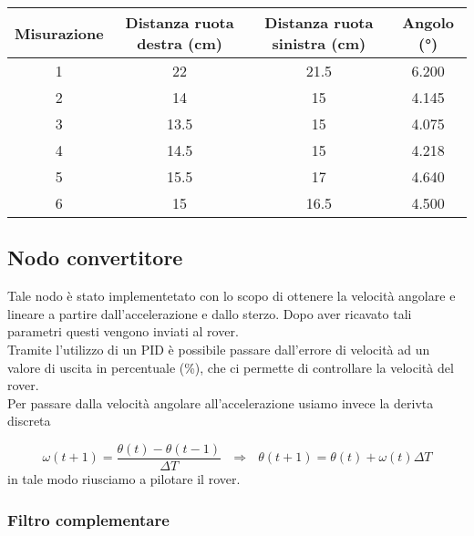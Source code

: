 \begin{table} [H]
    \centering
    \begin{tabular}{|c|c|c|c|}
    \hline
        Misurazione & Distanza ruota destra (cm) & Distanza ruota sinistra (cm) & Angolo (°) \\  \hline
        1 & 22 & 21.5& 6.200 \\  \hline
        2 & 14& 15& 4.145  \\  \hline
        3 & 13.5&15&  4.075 \\  \hline
        4 & 14.5&15&  4.218 \\  \hline
        5 & 15.5& 17& 4.640 \\  \hline
        6 & 15&16.5& 4.500  \\  \hline
    \end{tabular}
\end{table}

\subsection{Nodo convertitore}
Tale nodo è stato implementetato con lo scopo di ottenere la velocità angolare e lineare a partire dall'accelerazione e dallo sterzo. Dopo aver ricavato tali parametri questi vengono inviati al rover.\\
Tramite l'utilizzo di un PID è possibile passare dall'errore di velocità ad un valore di uscita in percentuale (\%), che ci permette di controllare la velocità del rover.\\ Per passare dalla velocità angolare all'accelerazione usiamo invece la derivta discreta

\begin{equation}
\omega(t+1)=\frac{\theta(t)-\theta(t-1)}{\Delta{T}} \ \ \
\Rightarrow \ \ \ \theta(t+1)=\theta(t)+\omega(t)\Delta{T}
\end{equation}  
in tale modo riusciamo a pilotare il rover.
\subsubsection{Filtro complementare}
